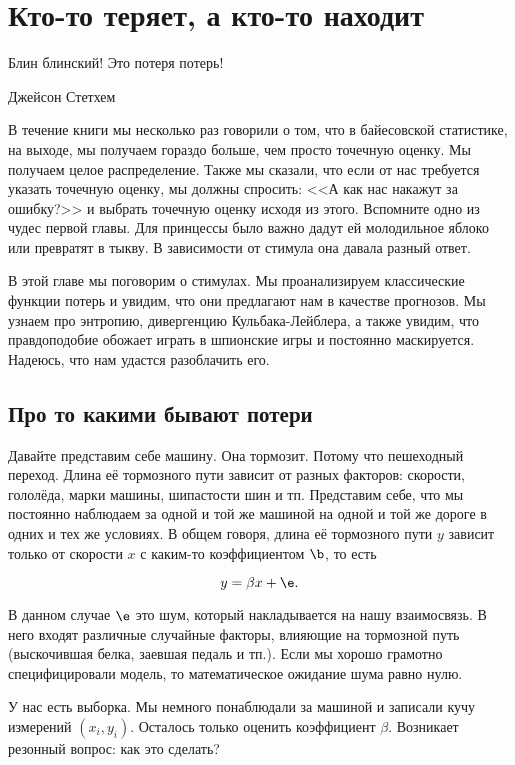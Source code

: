 

\chapter{Кто-то теряет, а кто-то находит} 

\epigraph{Блин блинский! Это потеря потерь!}{Джейсон Стетхем}

В течение книги мы несколько раз говорили о том, что в байесовской статистике, на выходе, мы получаем гораздо больше, чем просто точечную оценку. Мы получаем целое распределение.  Также мы сказали, что если от нас требуется указать точечную оценку, мы должны спросить: <<А как нас накажут за ошибку?>> и выбрать точечную оценку исходя из этого. Вспомните одно из чудес первой главы. Для принцессы было важно дадут ей молодильное яблоко или превратят в тыкву. В зависимости от стимула она давала разный ответ. 

В этой главе мы поговорим о стимулах. Мы проанализируем классические функции потерь и увидим, что они предлагают нам в качестве прогнозов. Мы узнаем про энтропию, дивергенцию Кульбака-Лейблера, а также увидим, что правдоподобие обожает играть в шпионские игры и постоянно маскируется. Надеюсь, что нам удастся разоблачить его. 

\section{Про то какими бывают потери} 

Давайте представим себе машину. Она тормозит. Потому что пешеходный переход. Длина её тормозного пути зависит от разных факторов: скорости, гололёда, марки машины, шипастости шин и тп. Представим себе, что мы постоянно наблюдаем за одной и той же машиной на одной и той же дороге в одних и тех же условиях. В общем говоря, длина её тормозного пути $y$ зависит только от скорости $x$ с каким-то коэффициентом $\b$, то есть 

\[ y = \beta x + \e. \]

В данном случае $\e$ это шум, который накладывается на нашу взаимосвязь. В него входят различные случайные факторы, влияющие на тормозной путь (выскочившая белка, заевшая педаль и тп.).  Если мы хорошо грамотно специфицировали модель, то математическое ожидание шума равно нулю. 

У нас есть выборка. Мы немного понаблюдали за машиной и записали кучу измерений $(x_i, y_i)$. Осталось только оценить коэффициент $\beta$.  Возникает резонный вопрос: как это сделать?

